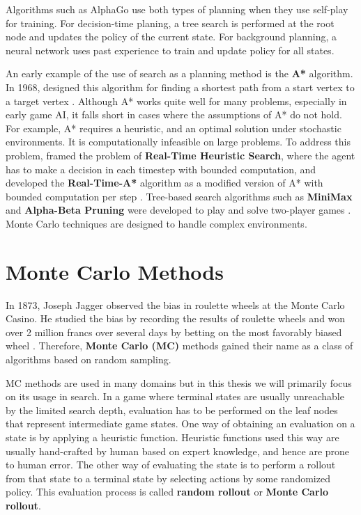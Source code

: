 Algorithms such as AlphaGo use both types of planning when they use self-play for training.
For decision-time planing, a tree search is performed at the root node and updates the policy of the current state.
For background planning, a neural network uses past experience to train and update policy for all states.

An early example of the use of search as a planning method is the \textbf{A*} algorithm.
In 1968, \citeauthor{FormalBasisHeuristic_Hart.Nilsson.ea_1968} designed this algorithm for finding a shortest path from a start vertex to a target vertex \cite{FormalBasisHeuristic_Hart.Nilsson.ea_1968}.
Although A* works quite well for many problems, especially in early game AI, it falls short in cases where the assumptions of A* do not hold.
For example, A* requires a heuristic, and an optimal solution under stochastic environments.
It is computationally infeasible on large problems.
To address this problem, \citeauthor{RealtimeHeuristicSearch_Korf_1990} framed the problem of \textbf{Real-Time Heuristic Search},
where the agent has to make a decision in each timestep with bounded computation, and developed the \textbf{Real-Time-A*} algorithm as a modified version of A* with bounded computation per step \cite{RealtimeHeuristicSearch_Korf_1990}.
Tree-based search algorithms such as \textbf{MiniMax} and \textbf{Alpha-Beta Pruning} were developed to play and solve two-player games \cite{AnalysisAlphabetaPruning_Knuth.Moore_1975}.
Monte Carlo techniques are designed to handle complex environments.

\section{Monte Carlo Methods}
In 1873, Joseph Jagger observed the bias in roulette wheels at the Monte Carlo Casino.
He studied the bias by recording the results of roulette wheels and won over 2 million francs over several days by betting on the most favorably biased wheel \cite{MonteCarloCasino__2022}.
Therefore, \textbf{Monte Carlo (MC)} methods gained their name as a class of algorithms based on random sampling.

MC methods are used in many domains but in this thesis we will primarily focus on its usage in search.
In a game where terminal states are usually unreachable by the limited search depth, evaluation has to be performed on the leaf nodes that represent intermediate game states.
One way of obtaining an evaluation on a state is by applying a heuristic function.
Heuristic functions used this way are usually hand-crafted by human based on expert knowledge, and hence are prone to human error.
The other way of evaluating the state is to perform a rollout from that state to a terminal state by selecting actions by some randomized policy.
This evaluation process is called \textbf{random rollout} or \textbf{Monte Carlo rollout}.

